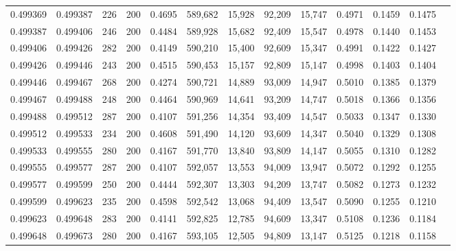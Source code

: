 \begin{tabular}{rrrrrrrrrrrrr}
0.499369 & 0.499387 &    226 & 200 &                                     0.4695 & 589,682 &  15,928 &  92,209 &  15,747 & 0.4971 & 0.1459 & 0.1475 \\
0.499387 & 0.499406 &    246 & 200 &                                     0.4484 & 589,928 &  15,682 &  92,409 &  15,547 & 0.4978 & 0.1440 & 0.1453 \\
0.499406 & 0.499426 &    282 & 200 &                                     0.4149 & 590,210 &  15,400 &  92,609 &  15,347 & 0.4991 & 0.1422 & 0.1427 \\
0.499426 & 0.499446 &    243 & 200 &                                     0.4515 & 590,453 &  15,157 &  92,809 &  15,147 & 0.4998 & 0.1403 & 0.1404 \\
0.499446 & 0.499467 &    268 & 200 &                                     0.4274 & 590,721 &  14,889 &  93,009 &  14,947 & 0.5010 & 0.1385 & 0.1379 \\
0.499467 & 0.499488 &    248 & 200 &                                     0.4464 & 590,969 &  14,641 &  93,209 &  14,747 & 0.5018 & 0.1366 & 0.1356 \\
0.499488 & 0.499512 &    287 & 200 &                                     0.4107 & 591,256 &  14,354 &  93,409 &  14,547 & 0.5033 & 0.1347 & 0.1330 \\
0.499512 & 0.499533 &    234 & 200 &                                     0.4608 & 591,490 &  14,120 &  93,609 &  14,347 & 0.5040 & 0.1329 & 0.1308 \\
0.499533 & 0.499555 &    280 & 200 &                                     0.4167 & 591,770 &  13,840 &  93,809 &  14,147 & 0.5055 & 0.1310 & 0.1282 \\
0.499555 & 0.499577 &    287 & 200 &                                     0.4107 & 592,057 &  13,553 &  94,009 &  13,947 & 0.5072 & 0.1292 & 0.1255 \\
0.499577 & 0.499599 &    250 & 200 &                                     0.4444 & 592,307 &  13,303 &  94,209 &  13,747 & 0.5082 & 0.1273 & 0.1232 \\
0.499599 & 0.499623 &    235 & 200 &                                     0.4598 & 592,542 &  13,068 &  94,409 &  13,547 & 0.5090 & 0.1255 & 0.1210 \\
0.499623 & 0.499648 &    283 & 200 &                                     0.4141 & 592,825 &  12,785 &  94,609 &  13,347 & 0.5108 & 0.1236 & 0.1184 \\
0.499648 & 0.499673 &    280 & 200 &                                     0.4167 & 593,105 &  12,505 &  94,809 &  13,147 & 0.5125 & 0.1218 & 0.1158 \\

\end{tabular}
